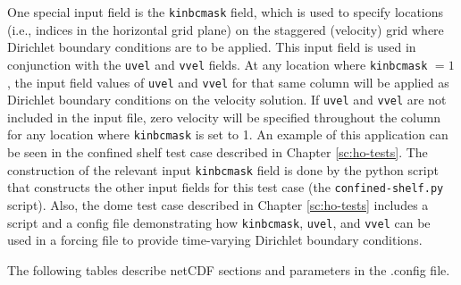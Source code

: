 One special input field is the \texttt{kinbcmask} field, which is used to specify locations (i.e.,
indices in the horizontal grid plane) on the staggered (velocity) grid where Dirichlet boundary 
conditions are to be applied. This input field is used in conjunction with the \texttt{uvel} and 
\texttt{vvel} fields. At any location where \texttt{kinbcmask} $= 1$, the input field
values of \texttt{uvel} and \texttt{vvel} for that same column will be applied as Dirichlet boundary
conditions on the velocity solution. If \texttt{uvel} and \texttt{vvel} are not included in the input file, 
zero velocity will be specified throughout the column for any location where \texttt{kinbcmask} is 
set to 1. An example of this application can be seen in the confined shelf test case described 
in Chapter \ref{sc:ho-tests}. The construction of the relevant input \texttt{kinbcmask} field 
is done by the python script that constructs the other input fields for this test case 
(the \texttt{confined-shelf.py} script).  Also, the dome test case described in 
Chapter \ref{sc:ho-tests} includes a script and a config file demonstrating how 
\texttt{kinbcmask}, \texttt{uvel}, and \texttt{vvel} 
can be used in a forcing file to provide time-varying Dirichlet boundary conditions. 

The following tables describe netCDF sections and parameters in the .config file.

